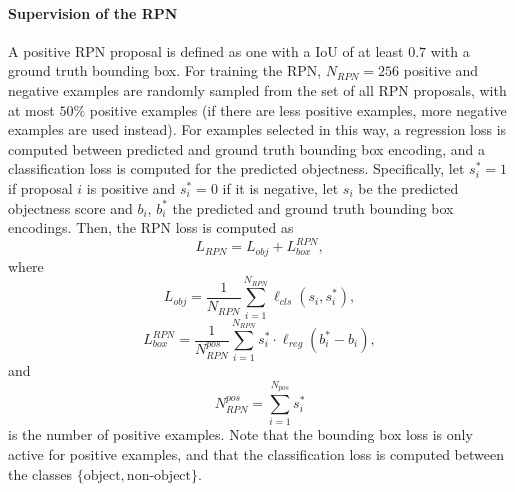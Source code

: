 \paragraph{Supervision of the RPN}
A positive RPN proposal is defined as one with a IoU of at least $0.7$ with
a ground truth bounding box. For training the RPN, $N_{RPN} = 256$  positive and negative
examples are randomly sampled from the set of all RPN proposals,
with at most $50\%$ positive examples (if there are less positive examples,
more negative examples are used instead).
For examples selected in this way, a regression loss is computed between
predicted and ground truth bounding box encoding, and a classification loss
is computed for the predicted objectness.
Specifically, let $s_i^* = 1$ if proposal $i$ is positive and $s_i^* = 0$ if
it is negative, let $s_i$ be the predicted objectness score and $b_i$, $b_i^*$ the
predicted and ground truth bounding box encodings.
Then, the RPN loss is computed as
\begin{equation}
L_{RPN} = L_{obj} + L_{box}^{RPN},
\end{equation}
where
\begin{equation}
L_{obj} = \frac{1}{N_{RPN}} \sum_{i=1}^{N_{RPN}} \ell_{cls}(s_i, s_i^*),
\end{equation}
\begin{equation}
L_{box}^{RPN} = \frac{1}{N_{RPN}^{pos}} \sum_{i=1}^{N_{RPN}} s_i^* \cdot \ell_{reg}(b_i^* - b_i),
\end{equation}
and
\begin{equation}
N_{RPN}^{pos} = \sum_{i=1}^{N_{pos}} s_i^*
\end{equation}
is the number of positive examples. Note that the bounding box loss is only
active for positive examples, and that the classification loss is computed
between the classes $\{\textrm{object},\textrm{non-object}\}$.

